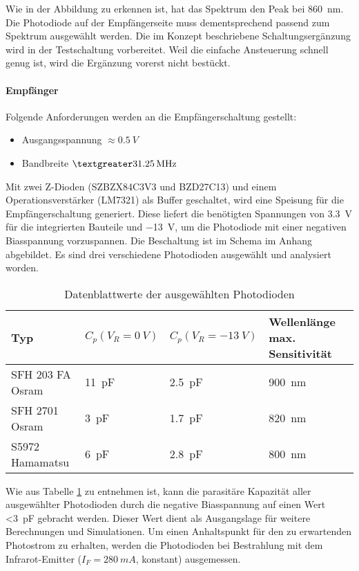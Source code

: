 Wie in der Abbildung zu erkennen ist, hat das Spektrum den Peak bei \SI{860}{nm}. Die Photodiode auf der Empfängerseite muss dementsprechend passend zum Spektrum ausgewählt werden. Die im Konzept beschriebene Schaltungsergänzung wird in der Testschaltung vorbereitet. Weil die einfache Ansteuerung schnell genug ist, wird die Ergänzung vorerst nicht bestückt.

\paragraph{Empfänger}
Folgende Anforderungen werden an die Empfängerschaltung gestellt:
\begin{itemize}
	\item Ausgangsspannung $\approx \SI{0.5}{V}$
	\item Bandbreite $\textgreater \SI{31.25}{MHz}$
\end{itemize}
Mit zwei Z-Dioden (SZBZX84C3V3 und BZD27C13) und einem Operationsverstärker (LM7321) als Buffer geschaltet, wird eine Speisung für die Empfängerschaltung generiert. Diese liefert die benötigten Spannungen von \SI{3.3}{V} für die integrierten Bauteile und \SI{-13}{V}, um die Photodiode mit einer negativen Biasspannung vorzuspannen. Die Beschaltung ist im Schema im Anhang abgebildet.
\newline
Es sind drei verschiedene Photodioden ausgewählt und analysiert worden.

\begin{table}[H]
\begin{tabular}{|l|l|l|l|}
	\hline 
	\textbf{Typ}&\textbf{$C_{p} (V_{R}=\SI{0}{V})$}  & \textbf{$C_{p} (V_{R}=\SI{-13}{V})$} & \textbf{Wellenlänge max. Sensitivität} \\ 
	\hline 
	SFH 203 FA Osram&\SI{11}{pF}  & \SI{2.5}{pF} & \SI{900}{nm} \\ 
	\hline 
	SFH 2701 Osram&\SI{3}{pF}  &\SI{1.7}{pF}  &\SI{820}{nm}  \\ 
	\hline 
	S5972 Hamamatsu&\SI{6}{pF}  &\SI{2.8}{pF}  &\SI{800}{nm}  \\ 
	\hline 
\end{tabular} 
\caption{Datenblattwerte der ausgewählten Photodioden}\label{tab:Tabelle_Photo}
\end{table}

Wie aus Tabelle \ref{tab:Tabelle_Photo} zu entnehmen ist, kann die parasitäre Kapazität aller ausgewählter Photodioden durch die negative Biasspannung auf einen Wert \textless \SI{3}{pF} gebracht werden. Dieser Wert dient als Ausgangslage für weitere Berechnungen und Simulationen.
\newline
Um einen Anhaltspunkt für den zu erwartenden Photostrom zu erhalten, werden die Photodioden bei Bestrahlung mit dem Infrarot-Emitter ($I_{F}=\SI{280}{mA}$, konstant) ausgemessen.

